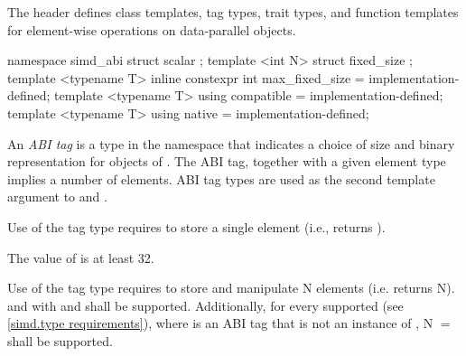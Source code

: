 

\pnum
The header  defines class templates, tag types, trait types, and function templates for element-wise operations on data-parallel objects.


\begin{itemdecl}
namespace simd_abi {
  struct scalar {};
  template <int N> struct fixed_size {};
  template <typename T> inline constexpr int max_fixed_size = implementation-defined;
  template <typename T> using compatible = implementation-defined;
  template <typename T> using native = implementation-defined;
}
\end{itemdecl}
\begin{itemdescr}
  \pnum
  An \emph{ABI tag} is a type in the  namespace that indicates a choice of size and binary representation for objects of \dataparalleltype.
  The ABI tag, together with a given element type implies a number of elements.
  ABI tag types are used as the second template argument to \simd and \mask.

  \pnum
  Use of the  tag type requires \dataparalleltypes to store a single element (i.e., \simd{} returns ).

  \pnum\label{simd.maxfixedsize.def}%
  The value of  is at least 32.

  \pnum\label{simd.fixedsize.def}%
  Use of the \fixedsizeN tag type requires \dataparalleltypes to store and manipulate \code N elements (i.e. \simd{} returns \code N).
   and  with  and  shall be supported.
  Additionally, for every supported \simd[<T, Abi>] (see \ref{simd.type requirements}), where  is an ABI tag that is not an instance of , \code N $=$  shall be supported.


\end{itemdescr}
